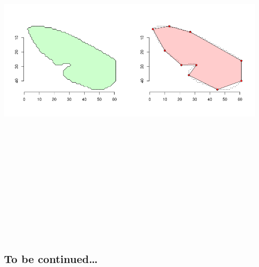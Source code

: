 \documentclass[
]{article}
\let\origfigure\figure
\let\endorigfigure\endfigure
\renewenvironment{figure}[1][2] {
    \expandafter\origfigure\expandafter[H]
} {
    \endorigfigure
}
\begin{document}
\begin{figure}
\centering
\includegraphics[width=\textwidth,height=7.29167in]{./img/Alpha_shape_1.png}
\caption{Concave hull after minimizing the number of points}
\end{figure}

\hypertarget{to-be-continued}{%
\subsection{To be continued\ldots{}}\label{to-be-continued}}
\end{document}

